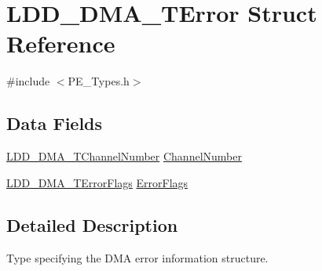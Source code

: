 \hypertarget{struct_l_d_d___d_m_a___t_error}{\section{L\-D\-D\-\_\-\-D\-M\-A\-\_\-\-T\-Error Struct Reference}
\label{struct_l_d_d___d_m_a___t_error}
}


{\ttfamily \#include $<$P\-E\-\_\-\-Types.\-h$>$}

\subsection*{Data Fields}
\begin{DoxyCompactItemize}
\item 
\hyperlink{group___p_e___types__module_gad268d607015891269cb015faa8bc0dac}{L\-D\-D\-\_\-\-D\-M\-A\-\_\-\-T\-Channel\-Number} \hyperlink{struct_l_d_d___d_m_a___t_error_abc8d0c6909178bc7fe3957b7c01afd08}{Channel\-Number}
\item 
\hyperlink{group___p_e___types__module_gaea6d9250a094d0f060ae12a0b7abb474}{L\-D\-D\-\_\-\-D\-M\-A\-\_\-\-T\-Error\-Flags} \hyperlink{struct_l_d_d___d_m_a___t_error_a9dd0a645e1763b4daa0058b1b29c4ad7}{Error\-Flags}
\end{DoxyCompactItemize}


\subsection{Detailed Description}
Type specifying the D\-M\-A error information structure. 

